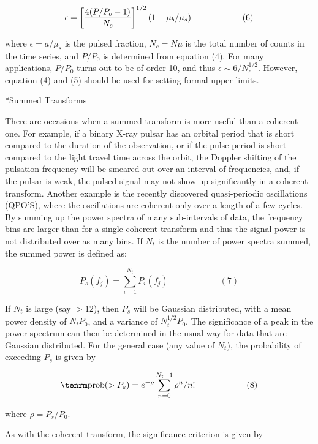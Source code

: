 $$\epsilon = \left[ {4(P/P_o -1)\over N_c}\right]^{1/2}(1 +
\mu_b/\mu_s)\qquad\qquad\qquad(6)$$

{\list

where $\epsilon = a/\mu_s$ is the pulsed fraction, $N_{c} = N\mu$ is the
total number
of counts in the time series, and $P/P_{0}$ is determined from equation (4).
For many applications, $P/P_{0}$ turns out to be of order 10, and thus
$\epsilon \sim 6/N_c^{1/2}$.
However, equation (4) and (5) should be used for setting
formal upper limits.

}


\**Summed Transforms

{\list

There are occasions when a summed transform is more useful than a coherent
one.  For example, if a binary X-ray pulsar has an orbital period that is
short compared to the duration of the observation, or if the pulse period
is short compared to the light travel time across the orbit, the Doppler
shifting of the pulsation frequency will be smeared out over an interval of
frequencies, and, if the pulsar is weak, the pulsed signal may not show up
significantly in a coherent transform.  Another example is the recently
discovered quasi-periodic oscillations (QPO'S), where the oscillations are
coherent only over a length of a few cycles.  By summing up the power spectra
of many sub-intervals of data, the frequency bins are larger than for a single
coherent transform and thus the signal power is not distributed over as many
bins.  If $N_{t}$ is the number of power spectra summed, the summed power is
defined as:

}

$$P_s(f_j) = \sum_{i=1}^{N_t} P_i(f_j)\qquad\qquad\qquad(7)$$

{\list

If $N_{t}$ is large (say $> 12$), then $P_s$ will be
Gaussian distributed, with a mean power density of $N_t P_0$, and a variance
of $N_t^{1/2}P_0$.  The significance of a peak in the power spectrum can
then be determined in the usual way for data that are Gaussian distributed.
For the general case (any value of $N_t$), the probability of 
exceeding $P_s$ is given by

}

$${\rm prob}(>P_{s}) = e^{-\rho} \sum_{n=0}^{N_t - 1} \rho^n /n!\qquad\qquad\qquad(8)$$

{\list

where $\rho = P_s/P_0$.

As with the coherent transform, the significance criterion is given by

}

